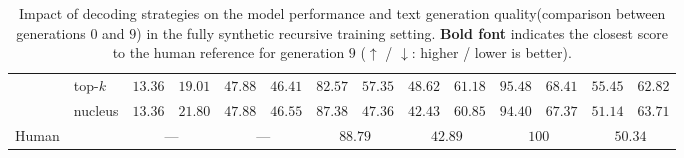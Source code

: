 \begin{table*}[t]
{\begin{tabular}{llcccccccccccc}
& top-$k$ & $13.36$ & $19.01$ & $47.88$ & $46.41$ & $82.57$ & $57.35$ & $48.62$ & $61.18$ & $95.48$ & $68.41$ & $55.45$ & $62.82$ \\
& nucleus & $13.36$ & $21.80$ & $47.88$ & $46.55$ & $87.38$ & $47.36$ & $42.43$ & $60.85$ & $94.40$ & $67.37$ & $51.14$ & $63.71$ \\
\midrule
Human & & \multicolumn{2}{c}{—} & \multicolumn{2}{c}{—} & \multicolumn{2}{c}{$88.79$} & \multicolumn{2}{c}{$42.89$} & \multicolumn{2}{c}{$100$} & \multicolumn{2}{c}{$50.34$} \\
\bottomrule
\end{tabular}
}
\caption{Impact of decoding strategies on the model performance and text generation quality(comparison between generations $0$ and $9$) in the fully synthetic recursive training setting. \textbf{Bold font} indicates the closest score to the human reference for generation $9$ ($\uparrow$ / $\downarrow$: higher / lower is better).}
\label{tab:data_quality_fully_synthetic}
\end{table*}